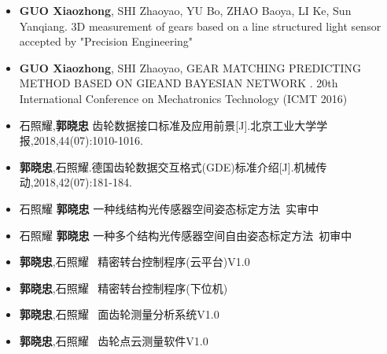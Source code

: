 %
%



\begin{itemize}
	\item \textbf{GUO Xiaozhong}, SHI Zhaoyao, YU Bo, ZHAO Baoya, LI Ke, Sun Yanqiang. 3D measurement of gears based on a line structured light sensor accepted by "Precision Engineering"\\
	 { \footnotesize {}} 
	 \item \textbf{GUO Xiaozhong}, SHI Zhaoyao, GEAR MATCHING PREDICTING METHOD BASED ON GIEAND BAYESIAN NETWORK .	20th International Conference on Mechatronics Technology (ICMT 2016)\\
	 { \footnotesize {}}
	 \item 石照耀,\textbf{郭晓忠} 齿轮数据接口标准及应用前景[J].北京工业大学学报,2018,44(07):1010-1016.	\\
	 { \footnotesize {}}
	\item \textbf{郭晓忠},石照耀.德国齿轮数据交互格式(GDE)标准介绍[J].机械传动,2018,42(07):181-184.\\
	 { \footnotesize {}}
	\item 石照耀 \textbf{郭晓忠}  一种线结构光传感器空间姿态标定方法\ 实审中\\
	 { \footnotesize {}}
	 \item 石照耀 \textbf{郭晓忠}  一种多个结构光传感器空间自由姿态标定方法\ 初审中\\
	 { \footnotesize {}}
	\item \textbf{郭晓忠},石照耀 \ 精密转台控制程序(云平台)V1.0 \\
	 { \footnotesize {}}
	 \item \textbf{郭晓忠},石照耀 \ 精密转台控制程序(下位机) \\
	 { \footnotesize {}}
	 \item \textbf{郭晓忠},石照耀  \ 面齿轮测量分析系统V1.0 \\
	 { \footnotesize {}}
	 \item \textbf{郭晓忠},石照耀 \  齿轮点云测量软件V1.0 \\
	 { \footnotesize {}}
\end{itemize}